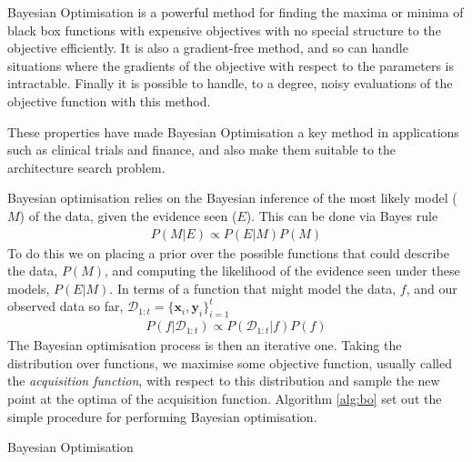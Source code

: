 Bayesian Optimisation is a powerful method for finding the maxima or minima of black box functions with expensive objectives with no special structure to the objective efficiently. It is also a gradient-free method, and so can handle situations where the gradients of the objective with respect to the parameters is intractable. Finally it is possible to handle, to a degree, noisy evaluations of the objective function with this method.

These properties have made Bayesian Optimisation a key method in applications such as clinical trials and finance, and also make them suitable to the architecture search problem.

Bayesian optimisation relies on the Bayesian inference of the most likely model (\( M \)) of the data, given the evidence seen (\( E \)). This can be done via Bayes rule
\begin{align}
	P(M|E) \propto P(E|M)P(M)
\end{align}
To do this we on placing a prior over the possible functions that could describe the data, \( P(M) \), and computing the likelihood of the evidence seen under these models, \( P(E|M) \). In terms of a function that might model the data, \( f \), and our observed data so far, \( \mathcal{D}_{1:t} = \{\mathbf{x}_i, \mathbf{y}_i\}_{i=1}^t \)
\begin{align}
	P(f|\mathcal{D}_{1:t}) \propto P(\mathcal{D}_{1:t} | f)P(f)
\end{align}
The Bayesian optimisation process is then an iterative one. Taking the distribution over functions, we maximise some objective function, usually called the \textit{acquisition function}, with respect to this distribution and sample the new point at the optima of the acquisition function. Algorithm \ref{alg:bo} set out the simple procedure for performing Bayesian optimisation.

\begin{algorithm}[t]
	\footnotesize
		
	\caption{Bayesian Optimisation}
	\label{alg:bo}
\end{algorithm}

